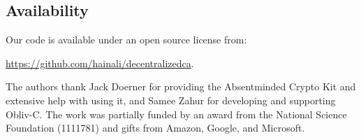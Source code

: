 \documentclass[sigconf]{acmart}
\begin{document}





%




\subsection*{Availability}

Our code is available under an open source license from:
\begin{center}
\url{https://github.com/hainali/decentralizedca}.
\end{center}

\begin{acks}
The authors thank Jack Doerner for providing the Absentminded Crypto Kit and extensive help with using it, and Samee Zahur for developing and supporting Obliv-C.  The work was partially funded by an award from the National Science Foundation (1111781) and gifts from Amazon, Google, and Microsoft.
\end{acks}

\appendix



\clearpage


\makeatletter
\def\url@bibstyle{%
  \@ifundefined{selectfont}{\def\UrlFont{\sf}}{\def\UrlFont{\scriptsize\sffamily}}}
\makeatother


\end{document}
